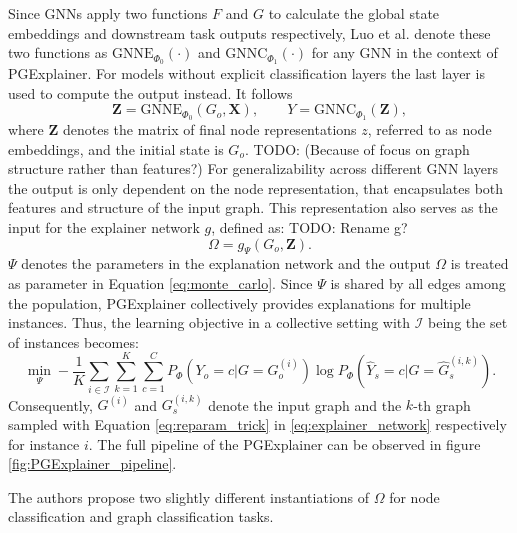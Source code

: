 Since GNNs apply two functions $F$ and $G$ to calculate the global state embeddings and downstream task outputs respectively, Luo et al. \cite{luo2020parameterized} denote these two functions as $\text{GNNE}_{\Phi_0}(\cdot)$ and $\text{GNNC}_{\Phi_1}(\cdot)$ for any GNN in the context of PGExplainer. For models without explicit classification layers the last layer is used to compute the output instead. It follows
\begin{equation}
    \mathbf{Z} = \text{GNNE}_{\Phi_0}(G_o, \mathbf{X}), \qquad Y = \text{GNNC}_{\Phi_1}(\mathbf{Z}),
\end{equation}
where $\mathbf{Z}$ denotes the matrix of final node representations $z$, referred to as node embeddings, and the initial state is $G_o$. TODO: (Because of focus on graph structure rather than features?) For generalizability across different GNN layers the output is only dependent on the node representation, that encapsulates both features and structure of the input graph. This representation also serves as the input for the explainer network $g$, defined as:
TODO: Rename g?
\begin{equation}
    \label{eq:explainer_network}
    \Omega = g_\Psi(G_o,\mathbf{Z}).
\end{equation}
$\Psi$ denotes the parameters in the explanation network and the output $\Omega$ is treated as parameter in Equation \ref{eq:monte_carlo}. Since $\Psi$ is shared by all edges among the population, PGExplainer collectively provides explanations for multiple instances. Thus, the learning objective in a collective setting with $\mathcal{I}$ being the set of instances becomes:
\begin{equation}
    \label{eq:mlp_loss}
    \min_\Psi -\frac{1}{K}\sum_{i\in \mathcal{I}}\sum_{k=1}^K\sum_{c=1}^C P_\Phi (Y_o = c|G = G_o^{(i)}) \log P_\Phi(\hat{Y}_s = c|G=\hat{G}_s^{(i,k)}).
\end{equation}
Consequently, $G^{(i)}$ and $G_s^{(i,k)}$ denote the input graph and the $k$-th graph sampled with Equation \ref{eq:reparam_trick} in \ref{eq:explainer_network} respectively for instance $i$. The full pipeline of the PGExplainer can be observed in figure \ref{fig:PGExplainer_pipeline}. 

The authors propose two slightly different instantiations of $\Omega$ for node classification and graph classification tasks.\bigskip

